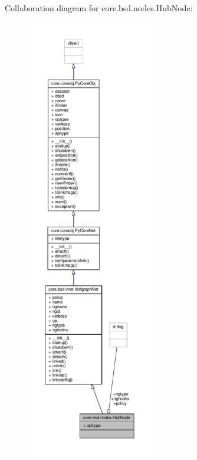 Collaboration diagram for core.\+bsd.\+nodes.\+Hub\+Node\+:
\nopagebreak
\begin{figure}[H]
\begin{center}
\leavevmode
\includegraphics[height=550pt]{classcore_1_1bsd_1_1nodes_1_1_hub_node__coll__graph}
\end{center}
\end{figure}
